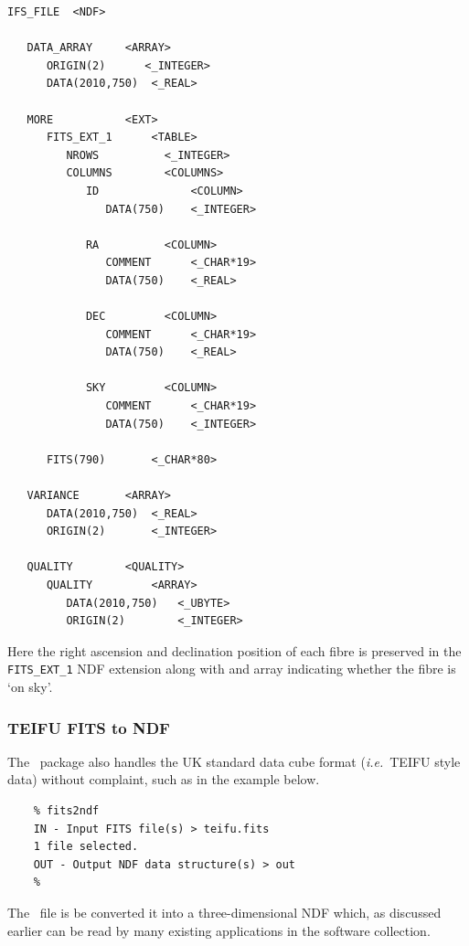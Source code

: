 \documentclass[twoside,11pt]{article}
\newcommand{\htmlref}[2]{#1}
\newcommand{\xref}[3]{#1}
\begin{document}
\begin{\htmlonly}
\small\begin{verbatim}
IFS_FILE  <NDF>

   DATA_ARRAY     <ARRAY>
      ORIGIN(2)      <_INTEGER>
      DATA(2010,750)  <_REAL>

   MORE           <EXT>
      FITS_EXT_1      <TABLE>
         NROWS          <_INTEGER>
         COLUMNS        <COLUMNS>
            ID              <COLUMN>
               DATA(750)    <_INTEGER>

            RA          <COLUMN>
               COMMENT      <_CHAR*19>
               DATA(750)    <_REAL>

            DEC         <COLUMN>
               COMMENT      <_CHAR*19>
               DATA(750)    <_REAL>

            SKY         <COLUMN>
               COMMENT      <_CHAR*19>
               DATA(750)    <_INTEGER> 

      FITS(790)       <_CHAR*80>

   VARIANCE       <ARRAY> 
      DATA(2010,750)  <_REAL>
      ORIGIN(2)       <_INTEGER>

   QUALITY        <QUALITY>
      QUALITY         <ARRAY>
         DATA(2010,750)   <_UBYTE>
         ORIGIN(2)        <_INTEGER>
\end{verbatim}\normalsize

Here the right ascension and declination position of each fibre is preserved in the
{\tt FITS\_EXT\_1} NDF extension along with and array indicating
whether the fibre is `on sky'.

\subsubsection{TEIFU FITS to NDF}

The \CONVERTref\ package also handles the UK standard data
cube format (\emph{i.e.}\ TEIFU style data) without complaint, such as
in the example below.

\begin{verbatim}
    % fits2ndf
    IN - Input FITS file(s) > teifu.fits
    1 file selected.
    OUT - Output NDF data structure(s) > out
    % 
\end{verbatim}

The \FITSref\ file is be converted it into a three-dimensional
\xref{NDF}{sun33}{} which, as \htmlref{discussed
earlier}{sc16_teifufile} can be read by many existing
applications in the software collection.


\end{\htmlonly}
\end{document}
